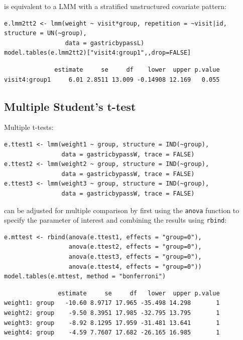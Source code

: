 \documentclass[12pt]{article}
\begin{document}
is equivalent to a LMM with a stratified unstructured covariate pattern:
\lstset{language=r,label= ,caption= ,captionpos=b,numbers=none}
\begin{lstlisting}
e.lmm2tt2 <- lmm(weight ~ visit*group, repetition = ~visit|id, structure = UN(~group),
                 data = gastricbypassL)
model.tables(e.lmm2tt2)["visit4:group1",,drop=FALSE]
\end{lstlisting}

\begin{verbatim}
              estimate     se     df    lower  upper p.value
visit4:group1     6.01 2.8511 13.009 -0.14908 12.169   0.055
\end{verbatim}


\clearpage

\subsection{Multiple Student's t-test}
\label{sec:org599b464}


Multiple t-tests:
\lstset{language=r,label= ,caption= ,captionpos=b,numbers=none}
\begin{lstlisting}
e.ttest1 <- lmm(weight1 ~ group, structure = IND(~group), 
                data = gastricbypassW, trace = FALSE)
e.ttest2 <- lmm(weight2 ~ group, structure = IND(~group), 
                data = gastricbypassW, trace = FALSE)
e.ttest3 <- lmm(weight3 ~ group, structure = IND(~group), 
                data = gastricbypassW, trace = FALSE)
\end{lstlisting}

can be adjusted for multiple comparison by first using the \texttt{anova}
function to specify the parameter of interest and combining the
results using \texttt{rbind}:
\lstset{language=r,label= ,caption= ,captionpos=b,numbers=none}
\begin{lstlisting}
e.mttest <- rbind(anova(e.ttest1, effects = "group=0"),
                  anova(e.ttest2, effects = "group=0"),
                  anova(e.ttest3, effects = "group=0"),
                  anova(e.ttest4, effects = "group=0"))
model.tables(e.mttest, method = "bonferroni")
\end{lstlisting}

\begin{verbatim}
               estimate     se     df   lower  upper p.value
weight1: group   -10.60 8.9717 17.965 -35.498 14.298       1
weight2: group    -9.50 8.3951 17.985 -32.795 13.795       1
weight3: group    -8.92 8.1295 17.959 -31.481 13.641       1
weight4: group    -4.59 7.7607 17.682 -26.165 16.985       1
\end{verbatim}
\end{document}
